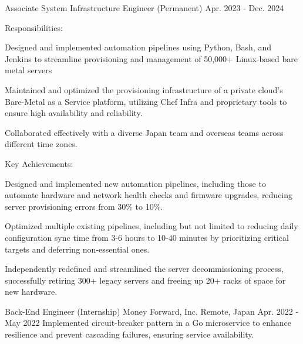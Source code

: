 \begin{cventries}
  \cventry
    {Associate System Infrastructure Engineer (Permanent)} %
    {} %
    {} %
    {Apr. 2023 - Dec. 2024} %
    {
        Responsibilities:
        \begin{cvbullets}
        \item Designed and implemented automation pipelines using Python, Bash, and Jenkins to streamline provisioning and management of 50,000+ Linux-based bare metal servers
        \item Maintained and optimized the provisioning infrastructure of a private cloud's Bare-Metal as a Service platform, utilizing Chef Infra and proprietary tools to ensure high availability and reliability.
        \item Collaborated effectively with a diverse Japan team and overseas teams across different time zones.
        \end{cvbullets}
        Key Achievements:
        \begin{cvbullets}
        \item Designed and implemented new automation pipelines, including those to automate hardware and network health checks and firmware upgrades, reducing server provisioning errors from 30\% to 10\%.
        \item Optimized multiple existing pipelines, including but not limited to reducing daily configuration sync time from 3-6 hours to 10-40 minutes by prioritizing critical targets and deferring non-essential ones.
        \item Independently redefined and streamlined the server decommissioning process, successfully retiring 300+ legacy servers and freeing up 20+ racks of space for new hardware.
        \end{cvbullets}
    }

  \cventry
    {Back-End Engineer (Internship)} %
    {Money Forward, Inc.} %
    {Remote, Japan} %
    {Apr. 2022 - May 2022} %
    {
        Implemented circuit-breaker pattern in a Go microservice to enhance resilience and prevent cascading failures, ensuring service availability.
    }



\end{cventries}

